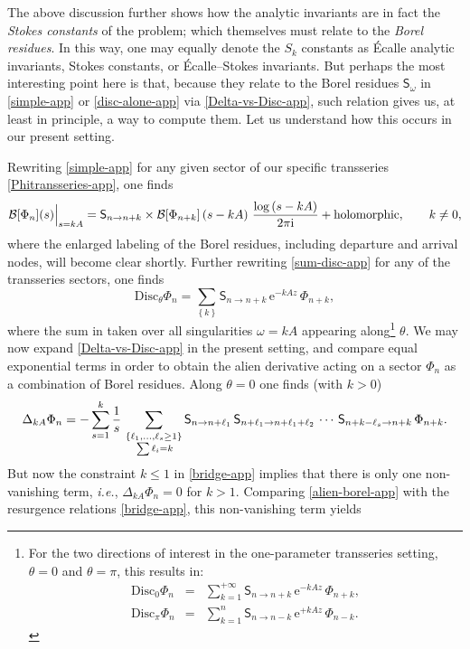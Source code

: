 \documentclass[11pt,a4paper]{article}
\newcommand{\CB}{{\cal B}}
\newcommand{\be}{\begin{equation}}
\newcommand{\ee}{\end{equation}}
\newcommand{\bea}{\begin{eqnarray}}
\newcommand{\eea}{\end{eqnarray}}
\def\disc{{\mathrm{Disc}}}
\newcommand{\rme}{{\mathrm{e}}}
\newcommand{\rmi}{{\mathrm{i}}}
\begin{document}
The above discussion further shows how the analytic invariants are in fact the \textit{Stokes constants} of the problem; which themselves must relate to the \textit{Borel residues}. In this way, one may equally denote the $S_k$ constants as \'Ecalle analytic invariants, Stokes constants, or \'Ecalle--Stokes invariants. But perhaps the most interesting point here is that, because they relate to the Borel residues $\mathsf{S}_\omega$ in \eqref{simple-app} or \eqref{disc-alone-app} via \eqref{Delta-vs-Disc-app}, such relation gives us, at least in principle, a way to compute them. Let us understand how this occurs in our present setting.

Rewriting \eqref{simple-app} for any given sector of our specific transseries \eqref{Phitransseries-app}, one finds
%
\be
\label{borel-gen-app}
\CB [\Phi_n] (s) \Big|_{s=kA} = \mathsf{S}_{n\to n+k} \times \CB [\Phi_{n+k}] \left( s-kA\right)\, \frac{\log \left( s-kA \right)}{2\pi\rmi} + \text{holomorphic}, \qquad k\neq0,
\ee
%
\noindent
where the enlarged labeling of the Borel residues, including departure and arrival nodes, will become clear shortly. Further rewriting \eqref{sum-disc-app} for any of the transseries sectors, one finds
%
\be
\label{disc-gen-app}
\disc_\theta \Phi_n = \sum_{ \left\{ k \right\} } \mathsf{S}_{n\to n+k}\, \rme^{-kAz}\, \Phi_{n+k},
\ee
%
\noindent
where the sum in taken over all singularities $\omega = kA$ appearing along\footnote{For the two directions of interest in the one-parameter transseries setting, $\theta=0$ and $\theta=\pi$, this results in:
%
\bea
\disc_0 \Phi_n &=& \sum_{k=1}^{+\infty} \mathsf{S}_{n\to n+k}\, \rme^{-kAz}\, \Phi_{n+k}, \\
\disc_\pi \Phi_n &=& \sum_{k=1}^{n} \mathsf{S}_{n\to n-k}\, \rme^{+kAz}\, \Phi_{n-k}.
\eea} $\theta$. We may now expand \eqref{Delta-vs-Disc-app} in the present setting, and compare equal exponential terms in order to obtain the alien derivative acting on a sector $\Phi_n$ as a combination of Borel residues. Along $\theta=0$ one finds (with $k>0$)
%
\be
\label{alien-borel-app}
\Delta_{kA} \Phi_n = - \sum_{s=1}^{k} \frac{1}{s}\, \sum_{\substack{\left\{ \ell_1,\ldots,\ell_s\ge 1 \right\} \\ \vphantom{\frac{1}{2}} \sum \ell_i=k}} \mathsf{S}_{n\to n+\ell_1}\, \mathsf{S}_{n+\ell_1\to n+\ell_1+\ell_2}\, \cdots\, \mathsf{S}_{n+k-\ell_s\to n+k}\, \Phi_{n+k}.
\ee
%
\noindent
But now the constraint $k\leq1$ in \eqref{bridge-app} implies that there is only one non-vanishing term, \textit{i.e.}, $\Delta_{kA} \Phi_n=0$ for $k>1$. Comparing \eqref{alien-borel-app} with the resurgence relations \eqref{bridge-app}, this non-vanishing term yields
\end{document}
